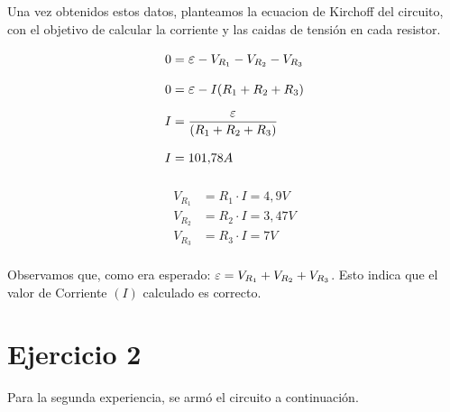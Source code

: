 \documentclass[12pt]{report}
\newcommand {\LEpsilon}{\mathlarger\varepsilon}
\begin{document}
Una vez obtenidos estos datos, planteamos la ecuacion de Kirchoff del circuito,
con el objetivo de calcular la corriente y las caidas de tensión en cada resistor.

\begin{minipage}[t]{0.48\textwidth}
  $$
  \begin{aligned}
    0 &= \LEpsilon - V_{R_1} - V_{R_2} - V_{R_3}\\[6pt]
    0 &= \LEpsilon - I (R_1 + R_2 + R_3)\\[6pt]
    I &= \frac{\LEpsilon}{(R_1 + R_2 + R_3)}\\[6pt]
    I &= 101,\!78A\\[6pt]
  \end{aligned}
  $$
\end{minipage}
\hfill
\begin{minipage}[t]{0.48\textwidth}
  \vspace{7mm}
  $$
  \begin{aligned}
    V_{R_1} &= R_1 \cdot I = 4,\!9 V\\[6pt]
    V_{R_2} &= R_2 \cdot I = 3,\!47 V\\[6pt]
    V_{R_3} &= R_3 \cdot I = 7 V\\[6pt]
  \end{aligned}
  $$
\end{minipage}

Observamos que, como era esperado: $\LEpsilon =  V_{R_1} + V_{R_2} + V_{R_3}$. Esto 
indica que el valor de Corriente $(I)$ calculado es correcto.

%
%
%
%

\chapter{Ejercicio 2}
Para la segunda experiencia, se armó el circuito a continuación.
\end{document}
